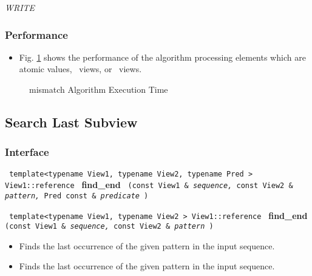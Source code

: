 \textit{WRITE}

\subsubsection{Performance} %

\begin{itemize}
\item
Fig. \ref{fig:mismatch-alg-exec-exper}
shows the performance of the algorithm processing
elements which are atomic values, \stl\ views, or \stapl\ views.
\end{itemize}

\begin{figure}[p]
\caption{mismatch Algorithm Execution Time}
\label{fig:mismatch-alg-exec-exper}
\end{figure}

 
\subsection{Search Last Subview} \label{sec-srch-find_end}

\subsubsection{Interface} %

\noindent
\texttt{%
template<typename View1, typename View2, typename Pred >
\newline
View1::reference 
}
\newline
\textbf{find\_end}%
\texttt{%
(const View1 \&
\textit{sequence,}%
const View2 \&
\textit{pattern,}%
Pred const \&
\textit{predicate}%
)
}
\vspace{0.4cm}

\noindent
\texttt{%
template<typename View1, typename View2 >
\newline
View1::reference 
}
\newline
\textbf{find\_end}%
\texttt{%
(const View1 \&
\textit{sequence,}%
const View2 \&
\textit{pattern}%
)
}

\begin{itemize}
\item
Finds the last occurrence of the given pattern in the input sequence. 
\item
Finds the last occurrence of the given pattern in the input sequence. 
\end{itemize}

